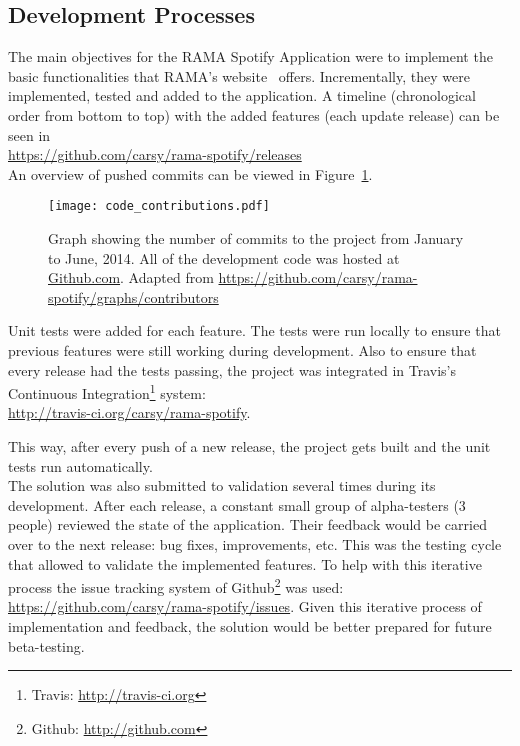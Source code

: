   \subsection{Development Processes} %
    \label{sub:development_process}

    The main objectives for the RAMA Spotify Application were to implement the basic functionalities that RAMA's website~\cite{ramaapp} offers.
    Incrementally, they were implemented, tested and added to the application.
    A timeline (chronological order from bottom to top) with the added features (each update release) can be seen in \\ 
    \indent \url{https://github.com/carsy/rama-spotify/releases} \\

    An overview of pushed commits can be viewed in Figure~\ref{fig:code_contributions}.

    \begin{figure}[H]
      \begin{center}
        \texttt{[image: code\_contributions.pdf]}
      \end{center}
      \caption{Graph showing the number of commits to the project from January to June, 2014. All of the development code was hosted at \url{Github.com}. Adapted from \url{https://github.com/carsy/rama-spotify/graphs/contributors}}
      \label{fig:code_contributions}
    \end{figure}

    Unit tests were added for each feature.
    The tests were run locally to ensure that previous features were still working during development.
    Also to ensure that every release had the tests passing, the project was integrated in Travis's Continuous Integration\footnote{Travis: \url{http://travis-ci.org}} system: \\
    \indent \url{http://travis-ci.org/carsy/rama-spotify}.

    This way, after every push of a new release, the project gets built and the unit tests run automatically. \\

    The solution was also submitted to validation several times during its development.
    After each release, a constant small group of alpha-testers (3 people) reviewed the state of the application.
    Their feedback would be carried over to the next release: bug fixes, improvements, etc.
    This was the testing cycle that allowed to validate the implemented features.
    To help with this iterative process the issue tracking system of Github\footnote{Github: \url{http://github.com}} was used: \url{https://github.com/carsy/rama-spotify/issues}.
    Given this iterative process of implementation and feedback, the solution would be better prepared for future beta-testing.

